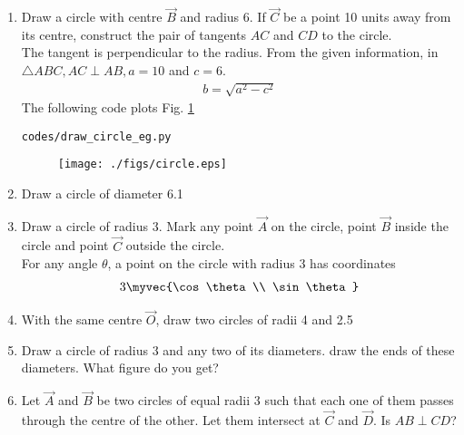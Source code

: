 \begin{enumerate}[label=\thesection.\arabic*
,ref=\thesection.\theenumi]
\item Draw a circle with centre $\vec{B}$ and radius 6.  If $\vec{C}$ be  a point 10 units  away from its 
centre, construct the pair of tangents $AC$ and $CD$ to the 
circle.
\\
\solution The tangent is perpendicular to the radius.
%
From the given information, in $\triangle ABC, AC \perp AB, a = 
10$ and $c = 6$.
\begin{align}
b =  \sqrt{a^2-c^2}
\end{align}
The following code plots Fig. \ref{fig:circle}
\begin{lstlisting}
codes/draw_circle_eg.py
\end{lstlisting}
\begin{figure}[!ht]
\texttt{[image: ./figs/circle.eps]}
\caption{}
\label{fig:circle}
\end{figure}
\item Draw a circle of diameter 6.1

\item Draw a circle of radius 3.  Mark any point $\vec{A}$ on the circle, point  $\vec{B}$ inside the circle  and point  $\vec{C}$ outside the circle.
\\
\solution 
For any angle $\theta$, a point on the circle with radius 3 has coordinates
\begin{align}
3\myvec{\cos \theta\\ \sin\theta}
\end{align}
\item With the same centre $\vec{O}$,  draw two circles of radii 4 and 2.5
\item Draw a circle of radius 3 and any two of its diameters.  draw the ends of these diameters. What figure do you get?
\item Let $\vec{A}$ and $\vec{B}$ be two circles of equal radii 3 such that each one of them passes through the centre of the other.  Let them intersect at $\vec{C}$ and $\vec{D}$.  Is $AB \perp CD$?


\end{enumerate}
